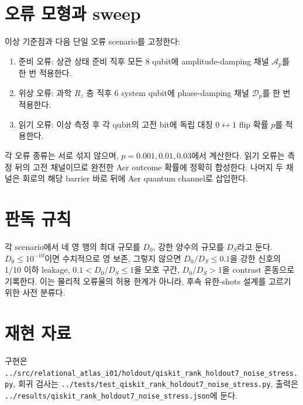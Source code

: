 \documentclass[11pt]{article}
\begin{document}
\section*{오류 모형과 sweep}
이상 기준점과 다음 단일 오류 scenario를 고정한다:
\begin{enumerate}
\item 준비 오류: 상관 상태 준비 직후 모든 8 qubit에 amplitude-damping 채널
  $\mathcal{A}_p$를 한 번 적용한다.
\item 위상 오류: 과학 $R_z$ 층 직후 6 system qubit에 phase-damping 채널
  $\mathcal{D}_p$를 한 번 적용한다.
\item 읽기 오류: 이상 측정 후 각 qubit의 고전 bit에 독립 대칭
  $0\leftrightarrow1$ flip 확률 $p$를 적용한다.
\end{enumerate}
각 오류 종류는 서로 섞지 않으며, $p=0.001,0.01,0.03$에서 계산한다.
읽기 오류는 측정 뒤의 고전 채널이므로 완전한 Aer outcome 확률에 정확히 합성한다.
나머지 두 채널은 회로의 해당 barrier 바로 뒤에 Aer quantum channel로 삽입한다.

\section*{판독 규칙}
각 scenario에서 네 영 행의 최대 규모를 $D_0$, 강한 양수의 규모를 $D_S$라고 둔다.
$D_0\le10^{-10}$이면 수치적으로 영 보존, 그렇지 않으면 $D_0/D_S\le0.1$을
강한 신호의 1/10 이하 leakage, $0.1<D_0/D_S\le1$을 모호 구간,
$D_0/D_S>1$을 contrast 혼동으로 기록한다. 이는 물리적 오류율의 허용 한계가 아니라,
후속 유한-shots 설계를 고르기 위한 사전 분류다.

\section*{재현 자료}
구현은 \texttt{../src/relational\_atlas\_i01/holdout/qiskit\_rank\_holdout7\_noise\_stress.py},
회귀 검사는 \texttt{../tests/test\_qiskit\_rank\_holdout7\_noise\_stress.py},
출력은 \texttt{../results/qiskit\_rank\_holdout7\_noise\_stress.json}에 둔다.
\end{document}

